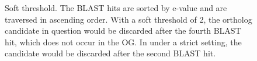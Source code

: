 \begin{figure}[h]
\centering
\def\svgwidth{0.6\textwidth}

\caption[Soft threshold]{
	Soft threshold. The BLAST hits are sorted by e-value and are traversed in
	ascending order. With a soft threshold of 2, the ortholog candidate in
	question would be discarded after the fourth BLAST hit, which does not occur
	in the OG. In \hamstr under a strict setting, the candidate would be discarded
	after the second BLAST hit.
}
\label{fig:soft-threshold}
\end{figure}
